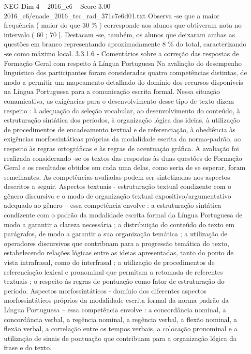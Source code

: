 \begin{textsample}{NEG Dim 4 – 2016\_c6 – Score 3.00 – 2016\_c6/enade\_2016\_tec\_rad\_371c7e6d01.txt}
Observa -se que a maior frequência ( maior do que 30 \% ) corresponde aos alunos que obtiveram nota no intervalo ( 60 ; 70 ].
Destacam -se, também, os alunos que deixaram ambas as questões em branco representando aproximadamente 8 \% do total, caracterizando -se como máximo local. 3.3.1.6 - Comentários sobre a correção das respostas de Formação Geral com respeito à Língua Portuguesa Na avaliação do desempenho linguístico dos participantes foram consideradas quatro competências distintas, de modo a permitir um mapeamento detalhado do domínio dos recursos disponíveis na Língua Portuguesa para a comunicação escrita formal.
Nessa situação comunicativa, as exigências para o desenvolvimento desse tipo de texto dizem respeito : à adequação da seleção vocabular, ao desenvolvimento do conteúdo, à estruturação sintática dos períodos, à organização lógica das ideias, à utilização de procedimentos de encadeamento textual e de referenciação, à obediência às exigências morfossintáticas próprias da modalidade escrita da norma-padrão, ao respeito às regras ortográficas e às regras de acentuação gráfica.
A avaliação foi realizada considerando -se os textos das respostas às duas questões de Formação Geral e os resultados obtidos em cada uma delas, como seria de se esperar, foram semelhantes.
As competências avaliadas podem ser sintetizadas nos aspectos descritos a seguir.
Aspectos textuais - estruturação textual condizente com o gênero discursivo e o modo de organização textual expositivo/argumentativo adequado ao gênero – essa competência envolve : a estruturação sintática condizente com o padrão da modalidade escrita formal da Língua Portuguesa de modo a garantir a clareza necessária ; a distribuição do conteúdo do texto em parágrafos, de modo a garantir a sua organização temática ; a utilização de operadores discursivos que contribuam para a progressão temática do texto, estabelecendo relações lógicas entre as ideias apresentadas, tanto do ponto de vista intrafrasal, como do interfrasal ; a utilização de procedimentos de referenciação lexical e pronominal que permitam a retomada de referentes textuais ; o respeito às regras de pontuação como fator de estruturação do período.
Aspectos morfossintáticos - domínio dos diferentes aspectos morfossintáticos próprios da modalidade escrita formal da norma-padrão da Língua Portuguesa – essa competência envolve : a concordância nominal, a concordância verbal, a regência nominal, a regência verbal, a flexão nominal, a flexão verbal, a correlação entre os tempos verbais, a colocação pronominal e a utilização de sinais de pontuação que contribuam para a organização lógica da frase e do texto.

\end{textsample}
